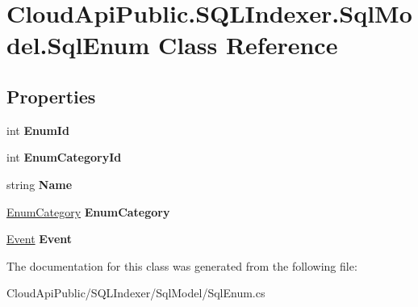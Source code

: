 \hypertarget{class_cloud_api_public_1_1_s_q_l_indexer_1_1_sql_model_1_1_sql_enum}{\section{Cloud\-Api\-Public.\-S\-Q\-L\-Indexer.\-Sql\-Model.\-Sql\-Enum Class Reference}
\label{class_cloud_api_public_1_1_s_q_l_indexer_1_1_sql_model_1_1_sql_enum}
}
\subsection*{Properties}
\begin{DoxyCompactItemize}
\item 
\hypertarget{class_cloud_api_public_1_1_s_q_l_indexer_1_1_sql_model_1_1_sql_enum_ae476c10f4550ed33082c02e885bd9a1f}{int {\bfseries Enum\-Id}}\label{class_cloud_api_public_1_1_s_q_l_indexer_1_1_sql_model_1_1_sql_enum_ae476c10f4550ed33082c02e885bd9a1f}

\item 
\hypertarget{class_cloud_api_public_1_1_s_q_l_indexer_1_1_sql_model_1_1_sql_enum_af8c103ebe1ea57e747e3659ba92d7e7a}{int {\bfseries Enum\-Category\-Id}}\label{class_cloud_api_public_1_1_s_q_l_indexer_1_1_sql_model_1_1_sql_enum_af8c103ebe1ea57e747e3659ba92d7e7a}

\item 
\hypertarget{class_cloud_api_public_1_1_s_q_l_indexer_1_1_sql_model_1_1_sql_enum_adc9a9b3f3d79f5633cd73faab327f633}{string {\bfseries Name}}\label{class_cloud_api_public_1_1_s_q_l_indexer_1_1_sql_model_1_1_sql_enum_adc9a9b3f3d79f5633cd73faab327f633}

\item 
\hypertarget{class_cloud_api_public_1_1_s_q_l_indexer_1_1_sql_model_1_1_sql_enum_a624976b79550d8c6667e94b444eb9c96}{\hyperlink{class_cloud_api_public_1_1_s_q_l_indexer_1_1_sql_model_1_1_enum_category}{Enum\-Category} {\bfseries Enum\-Category}}\label{class_cloud_api_public_1_1_s_q_l_indexer_1_1_sql_model_1_1_sql_enum_a624976b79550d8c6667e94b444eb9c96}

\item 
\hypertarget{class_cloud_api_public_1_1_s_q_l_indexer_1_1_sql_model_1_1_sql_enum_afbcfcf8ebc5dfae3f0ef5f0d925129aa}{\hyperlink{class_cloud_api_public_1_1_s_q_l_indexer_1_1_sql_model_1_1_event}{Event} {\bfseries Event}}\label{class_cloud_api_public_1_1_s_q_l_indexer_1_1_sql_model_1_1_sql_enum_afbcfcf8ebc5dfae3f0ef5f0d925129aa}

\end{DoxyCompactItemize}


The documentation for this class was generated from the following file\-:\begin{DoxyCompactItemize}
\item 
Cloud\-Api\-Public/\-S\-Q\-L\-Indexer/\-Sql\-Model/Sql\-Enum.\-cs\end{DoxyCompactItemize}
